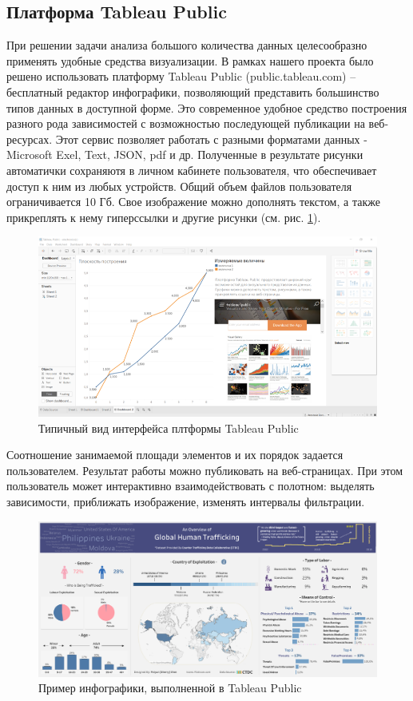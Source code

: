 \documentclass[a4paper,12pt]{article}
\begin{document}
\subsection{Платформа Tableau Public}
При решении задачи анализа большого количества данных целесообразно применять удобные средства визуализации. В рамках нашего проекта было решено использовать платформу Tableau Public (public.tableau.com) – бесплатный редактор инфографики, позволяющий представить большинство типов данных в доступной форме. Это современное удобное средство построения разного рода зависимостей с возможностью последующей публикации на веб-ресурсах. Этот сервис позволяет работать с разными форматами данных - Microsoft Exel, Text, JSON, pdf и др. Полученные в результате рисунки автоматички сохраняютя в личном кабинете пользователя, что обеспечивает доступ к ним из любых устройств. Общий объем файлов пользователя ограничивается 10 Гб. Свое изображение можно дополнять текстом, а также прикреплять к нему гиперссылки и другие рисунки (см. рис. \ref{fig:fig1}).

\begin{figure}[h]
	\centering
	\includegraphics[width=1\linewidth]{fig1}
	\caption{Типичный вид интерфейса плтформы Tableau Public}
	\label{fig:fig1}
\end{figure} 

Соотношение занимаемой площади элементов и их порядок задается пользователем.	Результат работы можно публиковать на веб-страницах. При этом пользователь может интерактивно взаимодействовать с полотном: выделять зависимости, приближать изображение, изменять интервалы фильтрации.

\begin{figure}[h]
	\centering
	\includegraphics[width=1\linewidth]{fig2}
	\caption{Пример инфографики, выполненной в Tableau Public}
	\label{fig:fig2}
\end{figure} 
\end{document}
